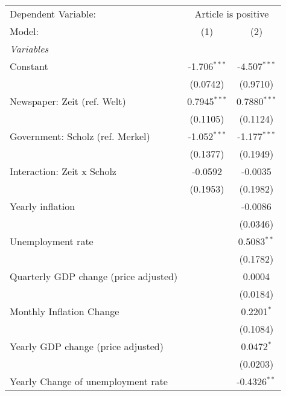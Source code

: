 
\begingroup
\centering
\begin{tabular}{lcc}
   \tabularnewline \midrule \midrule
   Dependent Variable: & \multicolumn{2}{c}{Article is positive}\\
   Model:                                & (1)            & (2)\\  
   \midrule
   \emph{Variables}\\
   Constant                              & -1.706$^{***}$ & -4.507$^{***}$\\   
                                         & (0.0742)       & (0.9710)\\   
   Newspaper: Zeit (ref. Welt)           & 0.7945$^{***}$ & 0.7880$^{***}$\\   
                                         & (0.1105)       & (0.1124)\\   
   Government: Scholz (ref. Merkel)      & -1.052$^{***}$ & -1.177$^{***}$\\   
                                         & (0.1377)       & (0.1949)\\   
   Interaction: Zeit x Scholz            & -0.0592        & -0.0035\\   
                                         & (0.1953)       & (0.1982)\\   
   Yearly inflation                      &                & -0.0086\\   
                                         &                & (0.0346)\\   
   Unemployment rate                     &                & 0.5083$^{**}$\\   
                                         &                & (0.1782)\\   
   Quarterly GDP change (price adjusted) &                & 0.0004\\   
                                         &                & (0.0184)\\   
   Monthly Inflation Change              &                & 0.2201$^{*}$\\   
                                         &                & (0.1084)\\   
   Yearly GDP change (price adjusted)    &                & 0.0472$^{*}$\\   
                                         &                & (0.0203)\\   
   Yearly Change of unemployment rate    &                & -0.4326$^{**}$\\   

\end{tabular}
